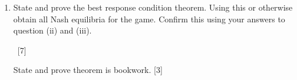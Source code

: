\documentclass[12pt,a4paper,twoside]{article}
\begin{document}
\begin{enumerate}
\begin{enumerate}
\begin{enumerate}
\begin{solution}
                    \end{solution}


            \item State and prove the best response condition theorem. Using this or
                otherwise
                obtain all Nash equilibria for the game. Confirm this using your
                    answers to question (ii) and (iii).

            ~\hfill{[7]}

            \begin{solution}
                State and prove theorem is bookwork. \hfill{[3]}

            \end{solution}


\end{enumerate}
\end{enumerate}
\end{enumerate}
\end{document}
